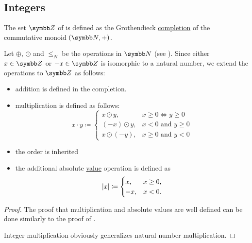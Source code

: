 \subsection{Integers}\label{subsec:integers}

\begin{definition}\label{def:integers}
  The set \( \BZ \) of  is defined as the Grothendieck \hyperref[thm:monoid_completion_to_abelian_group]{completion} of the commutative monoid \( (\BN, +) \).

  Let \( \oplus \), \( \odot \) and \( \leq_N \) be the operations in \( \BN \) (see ). Since either \( x \in \BZ \) or \( -x \in \BZ \) is isomorphic to a natural number, we extend the operations to \( \BZ \) as follows:
  \begin{itemize}
    \item addition is defined in the completion.
    \item multiplication is defined as follows:
          \begin{equation*}
            x \cdot y \coloneqq \begin{cases}
              x \odot y,    & x \geq 0 \iff y \geq 0      \\
              (-x) \odot y, & x < 0 \text{ and } y \geq 0 \\
              x \odot (-y), & x \geq 0 \text{ and } y < 0
            \end{cases}
          \end{equation*}

    \item the order is inherited
    \item the additional absolute \hyperref[def:absolute_value]{value} operation is defined as
          \begin{equation*}
            \left\vert x \right\vert \coloneqq \begin{cases}
              x,  & x \geq 0, \\
              -x, & x < 0.
            \end{cases}
          \end{equation*}
  \end{itemize}
\end{definition}
\begin{proof}
  The proof that multiplication and absolute values are well defined can be done similarly to the proof of .

  Integer multiplication obviously generalizes natural number multiplication.
\end{proof}

